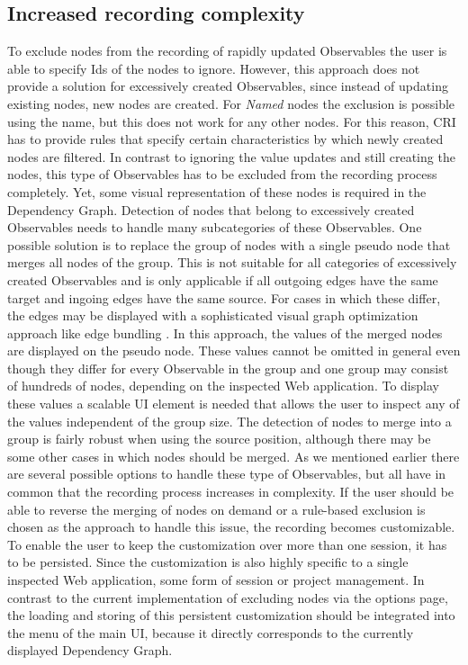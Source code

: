\subsection{Increased recording complexity}
To exclude nodes from the recording of rapidly updated Observables the user is able to specify Ids of the nodes to ignore. However, this approach does not provide a solution for excessively created Observables, since instead of updating existing nodes, new nodes are created. For \emph{Named} nodes the exclusion is possible using the name, but this does not work for any other nodes. For this reason, CRI has to provide rules that specify certain characteristics by which newly created nodes are filtered. In contrast to ignoring the value updates and still creating the nodes, this type of Observables has to be excluded from the recording process completely. Yet, some visual representation of these nodes is required in the Dependency Graph. Detection of nodes that belong to excessively created Observables needs to handle many subcategories of these Observables. One possible solution is to replace the group of nodes with a single pseudo node that merges all nodes of the group. This is not suitable for all categories of excessively created Observables and is only applicable if all outgoing edges have the same target and ingoing edges have the same source. For cases in which these differ, the edges may be displayed with a sophisticated visual graph optimization approach like edge bundling \cite{EdgeBundling}. In this approach, the values of the merged nodes are displayed on the pseudo node. These values cannot be omitted in general even though they differ for every Observable in the group and one group may consist of hundreds of nodes, depending on the inspected Web application. To display these values a scalable UI element is needed that allows the user to inspect any of the values independent of the group size. The detection of nodes to merge into a group is fairly robust when using the source position, although there may be some other cases in which nodes should be merged. As we mentioned earlier there are several possible options to handle these type of Observables, but all have in common that the recording process increases in complexity. If the user should be able to reverse the merging of nodes on demand or a rule-based exclusion is chosen as the approach to handle this issue, the recording becomes customizable. To enable the user to keep the customization over more than one session, it has to be persisted. Since the customization is also highly specific to a single inspected Web application, some form of session or project management. In contrast to the current implementation of excluding nodes via the options page, the loading and storing of this persistent customization should be integrated into the menu of the main UI, because it directly corresponds to the currently displayed Dependency Graph.
	
